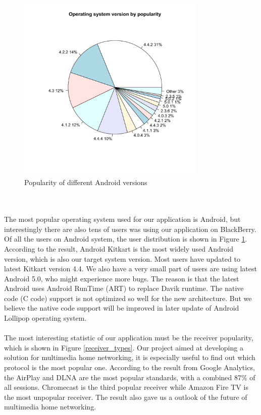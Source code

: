 \\
\begin{figure}[htb]
\centering \includegraphics[height=9cm]{charts/os_version_popularity}
\caption{Popularity of different Android versions \label{os_versions}}
\end{figure}\\
\\
The most popular operating system used for our application is Android, but interestingly there are also tens of users was using our application on BlackBerry. Of all the users on Android system, the user distribution is shown in Figure \ref{os_versions}. According to the result, Android Kitkart is the most widely used Android version, which is also our target system version. Most users have updated to latest Kitkart version 4.4. We also have a very small part of users are using latest Android 5.0, who might experience more bugs. The reason is that the latest Android uses Android RunTime (ART) to replace Davik runtime. The native code (C code) support is not optimized so well for the new architecture. But we believe the native code support will be improved in later update of Android Lollipop operating system.\\
\\
The most interesting statistic of our application must be the receiver popularity, which is shown in Figure \ref{receiver_types}. Our project aimed at developing a solution for multimedia home networking, it is especially useful to find out which protocol is the most popular one. According to the result from Google Analytics, the AirPlay and DLNA are the most popular standards, with a combined 87\% of all sessions. Chromecast is the third popular receiver while Amazon Fire TV is the most unpopular receiver. The result also gave us a outlook of the future of multimedia home networking.\\
